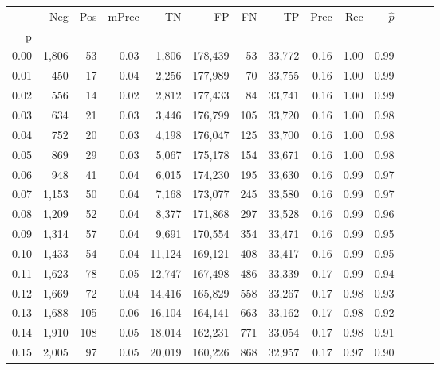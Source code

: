 \begin{tabular}{rrrrrrrrrrrrrr}
\toprule
{} &    Neg &  Pos & mPrec &       TN &       FP &      FN &      TP &  Prec &   Rec & $\hat{p}$ \\
p    &        &      &       &          &          &         &         &       &       &           \\
\midrule
0.00 &  1,806 &   53 &  0.03 &    1,806 &  178,439 &      53 &  33,772 &  0.16 &  1.00 &      0.99 \\
0.01 &    450 &   17 &  0.04 &    2,256 &  177,989 &      70 &  33,755 &  0.16 &  1.00 &      0.99 \\
0.02 &    556 &   14 &  0.02 &    2,812 &  177,433 &      84 &  33,741 &  0.16 &  1.00 &      0.99 \\
0.03 &    634 &   21 &  0.03 &    3,446 &  176,799 &     105 &  33,720 &  0.16 &  1.00 &      0.98 \\
0.04 &    752 &   20 &  0.03 &    4,198 &  176,047 &     125 &  33,700 &  0.16 &  1.00 &      0.98 \\
0.05 &    869 &   29 &  0.03 &    5,067 &  175,178 &     154 &  33,671 &  0.16 &  1.00 &      0.98 \\
0.06 &    948 &   41 &  0.04 &    6,015 &  174,230 &     195 &  33,630 &  0.16 &  0.99 &      0.97 \\
0.07 &  1,153 &   50 &  0.04 &    7,168 &  173,077 &     245 &  33,580 &  0.16 &  0.99 &      0.97 \\
0.08 &  1,209 &   52 &  0.04 &    8,377 &  171,868 &     297 &  33,528 &  0.16 &  0.99 &      0.96 \\
0.09 &  1,314 &   57 &  0.04 &    9,691 &  170,554 &     354 &  33,471 &  0.16 &  0.99 &      0.95 \\
0.10 &  1,433 &   54 &  0.04 &   11,124 &  169,121 &     408 &  33,417 &  0.16 &  0.99 &      0.95 \\
0.11 &  1,623 &   78 &  0.05 &   12,747 &  167,498 &     486 &  33,339 &  0.17 &  0.99 &      0.94 \\
0.12 &  1,669 &   72 &  0.04 &   14,416 &  165,829 &     558 &  33,267 &  0.17 &  0.98 &      0.93 \\
0.13 &  1,688 &  105 &  0.06 &   16,104 &  164,141 &     663 &  33,162 &  0.17 &  0.98 &      0.92 \\
0.14 &  1,910 &  108 &  0.05 &   18,014 &  162,231 &     771 &  33,054 &  0.17 &  0.98 &      0.91 \\
0.15 &  2,005 &   97 &  0.05 &   20,019 &  160,226 &     868 &  32,957 &  0.17 &  0.97 &      0.90 \\

\end{tabular}
